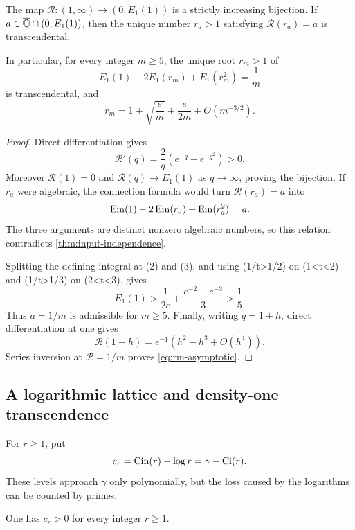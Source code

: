 \begin{theorem}
\label{thm:inverse-levels}
The map \(\mathscr R:(1,\infty)\to(0,E_1(1))\) is a strictly increasing
bijection.  If \(a\in\overline{\mathbb Q}\cap(0,E_1(1))\), then the unique number
\(r_a>1\) satisfying \(\mathscr R(r_a)=a\) is transcendental.

In particular, for every integer \(m\ge5\), the unique root \(r_m>1\) of
\begin{equation}\label{eq:rm-level}
 E_1(1)-2E_1(r_m)+E_1(r_m^2)=\frac1m
\end{equation}
is transcendental, and
\begin{equation}\label{eq:rm-asymptotic}
 r_m=1+\sqrt{\frac em}+\frac e{2m}+O(m^{-3/2}).
\end{equation}
\end{theorem}

\begin{proof}
Direct differentiation gives
\[
 \mathscr R'(q)=\frac2q(e^{-q}-e^{-q^2})>0.
\]
Moreover \(\mathscr R(1)=0\) and
\(\mathscr R(q)\to E_1(1)\) as \(q\to\infty\), proving the bijection.
If \(r_a\) were algebraic, the connection formula would turn
\(\mathscr R(r_a)=a\) into
\[
 \operatorname{Ein}(1)-2\operatorname{Ein}(r_a)+\operatorname{Ein}(r_a^2)=a.
\]
The three arguments are distinct nonzero algebraic numbers, so this relation
contradicts \cref{thm:input-independence}.

Splitting the defining integral at (2) and (3), and using
(1/t>1/2) on (1<t<2) and (1/t>1/3) on (2<t<3), gives
\[
 E_1(1)>\frac1{2e}+\frac{e^{-2}-e^{-3}}3>\frac15.
\]
Thus \(a=1/m\) is admissible for \(m\ge5\).  Finally, writing \(q=1+h\),
direct differentiation at one gives
\[
 \mathscr R(1+h)=e^{-1}(h^2-h^3+O(h^4)).
\]
Series inversion at \(\mathscr R=1/m\) proves
\eqref{eq:rm-asymptotic}.
\end{proof}

\subsection{A logarithmic lattice and density-one transcendence}

For \(r\ge1\), put
\begin{equation}\label{eq:cr}
 c_r=\operatorname{Cin}(r)-\log r=\gamma-\operatorname{Ci}(r).
\end{equation}
These levels approach \(\gamma\) only polynomially, but the loss caused by
the logarithms can be counted by primes.

\begin{lemma}\label{lem:cr-positive}
One has \(c_r>0\) for every integer \(r\ge1\).
\end{lemma}


